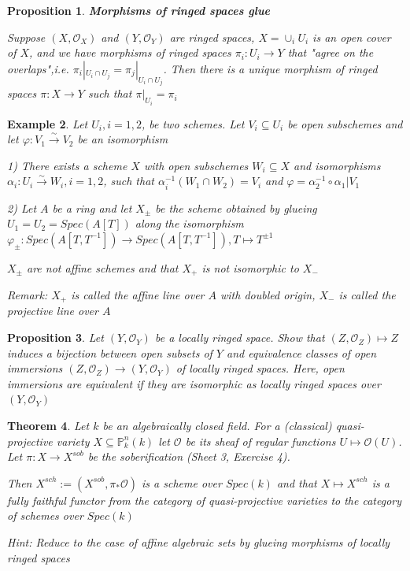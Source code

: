 \documentclass{article}
\newtheorem{theorem}{Theorem}[section]
\newtheorem{example}[theorem]{Example}
\newtheorem{proposition}[theorem]{Proposition}
\begin{document}
\begin{proposition}
    \textbf{Morphisms of ringed spaces glue}
    
    Suppose $(X,{\mathcal{O}}_{X})$ and $(Y,{\mathcal{O}}_{Y})$ are ringed spaces, $X=\cup_{i}U_i$ is an open cover of $X$, and we have morphisms of ringed spaces $\pi_{i}\colon U_{i} \rightarrow{Y}$ that "agree on the overlaps",i.e. $\pi_{i}|_{U_i\cap U_j}=\pi_{j}|_{U_i\cap U_j}$.  Then there is a unique morphism of ringed spaces $\pi\colon X\to Y$ such that $\pi|_{U_i}=\pi_{i}$
    \label{prop 3.24}
\end{proposition}


\begin{example}
Let $U_i, i = 1, 2$, be two schemes. Let $V_i \subseteq U_i$ be open subschemes and let $\varphi: V_1
\xrightarrow{\sim} V_2$ be an
isomorphism

1) There exists a scheme $X$ with open subschemes $W_i \subseteq X$ and isomorphisms $\alpha_i: U_i\xrightarrow{\sim}W_i, i = 1, 2$, such that $\alpha_i^{-1}(W_1 \cap W_2)= V_i$ and $\varphi = \alpha_2^{-1}\circ \alpha_1|V_1$

2) Let $A$ be a ring and let $X_{\pm}$ be the scheme obtained by glueing $U_1 = U_2 = Spec(A[T])$ along the
isomorphism $\varphi_{\pm} : Spec(A[T, T^{-1}]) \to Spec(A[T, T^{-1}]), T\mapsto T^{\pm 1}$ 

$X_\pm$ are not affine
schemes and that $X_+$ is not isomorphic to $X_-$

Remark: $X_+$ is called the affine line over $A$ with doubled origin, $X_-$ is called the projective line
over $A$
\end{example}
\begin{proposition}
Let $(Y, \mathcal O_Y )$ be a locally ringed space. Show that $(Z, \mathcal O_Z) \mapsto Z$ induces a bijection between
open subsets of $Y$ and equivalence classes of open immersions $(Z, \mathcal O_Z) \to (Y, \mathcal O_Y)$ of locally ringed
spaces. Here, open immersions are equivalent if they are isomorphic as locally ringed spaces over
$(Y, \mathcal O_Y )$
\end{proposition}
\begin{theorem}
Let $k$ be an algebraically closed field. For a (classical) quasi-projective variety $X \subseteq \mathbb P^n_k
(k)$ let
$\mathcal O$ be its sheaf of regular functions $U \mapsto \mathcal O(U)$. Let $\pi : X \to X^{sob}$ be the soberification (Sheet 3,
Exercise 4). 

Then $X^{sch} := (X^{sob}, \pi_\ast \mathcal O)$ is a scheme over $Spec(k)$ and that $X \mapsto X^{sch}$ is a
fully faithful functor from the category of quasi-projective varieties to the category of schemes over
$Spec(k)$

Hint: Reduce to the case of affine algebraic sets by glueing morphisms of locally ringed spaces
\end{theorem}
\end{document}
